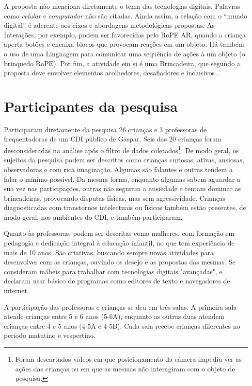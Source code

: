 A proposta não menciona diretamente o tema das tecnologias digitais. Palavras como \textit{celular} e \textit{computador} não são citadas. Ainda assim, a relação com o “mundo digital” é aderente aos eixos e abordagens metodológicas propostas. As Interações, por exemplo, podem ser favorecidas pelo RoPE AR, quando a criança aperta botões e encaixa blocos que provocam reações em um objeto. Há também o uso de uma Linguagem para comunicar uma sequência de ações à um objeto (o brinquedo RoPE). Por fim, a atividade em si é uma Brincadeira, que segundo a proposta deve envolver elementos acolhedores, desafiadores e inclusivos \cite[p.50]{gaspar_proposta_2010}. 


\section{Participantes da pesquisa}
\label{sec:participantes}

Participaram diretamente da pesquisa 26 crianças e 3 professoras de frequentadoras de um CDI público de Gaspar. Seis das 20 crianças foram desconsideradas na análise após o filtro de dados coletados\footnote{Foram descartados vídeos em que posicionamento da câmera impediu ver as ações das crianças ou em que as mesmas não interagiram com o objeto de pesquisa.}. De modo geral, os sujeitos da pesquisa podem ser descritos como crianças curiosas, ativas, ansiosas, observadoras e com rica imaginação. Algumas são falantes e outras tendem a falar o mínimo possível. Da mesma forma, enquanto algumas sabem aguardar a sua vez nas participações, outras não seguram a ansiedade e tentam dominar as brincadeiras, provocando disputas físicas, mas sem agressividade. Crianças diagnosticadas com transtornos intelectuais ou físicos também estão presentes, de modo geral, nos ambientes do CDI, e também participaram.

Quanto às professoras, podem ser descritas como mulheres, com formação em pedagogia e dedicação integral à educação infantil, no que tem experiência de mais de 10 anos. São criativas, buscando sempre novas atividades para desenvolver com as crianças, ouvindo os desejo e as propostas das mesmas. Se consideram inábeis para trabalhar com tecnologias digitais "avançadas", e declaram usar básico de programas como editores de texto e navegadores de internet.

A participação das professoras e crianças se deu em três salas. A primeira sala atende crianças entre 5 e 6 anos (5-6A), enquanto as outras duas atendem crianças entre 4 e 5 anos (4-5A e 4-5B). Cada sala recebe crianças diferentes no período matutino e vespertino.

